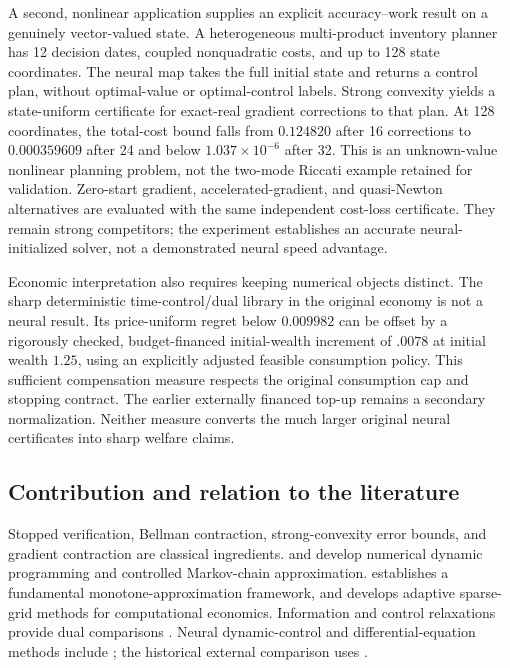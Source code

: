 A second, nonlinear application supplies an explicit accuracy--work result on a genuinely vector-valued state. A heterogeneous multi-product inventory planner has 12 decision dates, coupled nonquadratic costs, and up to 128 state coordinates. The neural map takes the full initial state and returns a control plan, without optimal-value or optimal-control labels. Strong convexity yields a state-uniform certificate for exact-real gradient corrections to that plan. At 128 coordinates, the total-cost bound falls from $0.124820$ after 16 corrections to $0.000359609$ after 24 and below $1.037\times10^{-6}$ after 32. This is an unknown-value nonlinear planning problem, not the two-mode Riccati example retained for validation. Zero-start gradient, accelerated-gradient, and quasi-Newton alternatives are evaluated with the same independent cost-loss certificate. They remain strong competitors; the experiment establishes an accurate neural-initialized solver, not a demonstrated neural speed advantage.

Economic interpretation also requires keeping numerical objects distinct. The sharp deterministic time-control/dual library in the original economy is not a neural result. Its price-uniform regret below $0.009982$ can be offset by a rigorously checked, budget-financed initial-wealth increment of $.0078$ at initial wealth $1.25$, using an explicitly adjusted feasible consumption policy. This sufficient compensation measure respects the original consumption cap and stopping contract. The earlier externally financed top-up remains a secondary normalization. Neither measure converts the much larger original neural certificates into sharp welfare claims.

\subsection{Contribution and relation to the literature}
Stopped verification, Bellman contraction, strong-convexity error bounds, and gradient contraction are classical ingredients. \citet{Judd1998} and \citet{KushnerDupuis2001} develop numerical dynamic programming and controlled Markov-chain approximation. \citet{BarlesSouganidis1991} establishes a fundamental monotone-approximation framework, and \citet{BrummScheidegger2017} develops adaptive sparse-grid methods for computational economics. Information and control relaxations provide dual comparisons \citep{BrownSmithSun2010,BrownSmith2011}. Neural dynamic-control and differential-equation methods include \citet{HanE2016,HanJentzenE2018}; the historical external comparison uses \citet{CaiFangZhou2025}.

